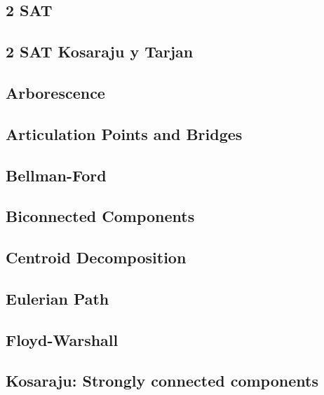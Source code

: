 \subsection{2 SAT}
\raggedbottom
\hrulefill
\subsection{2 SAT Kosaraju y Tarjan}
\raggedbottom
\hrulefill
\subsection{Arborescence}
\raggedbottom
\hrulefill
\subsection{Articulation Points and Bridges}
\raggedbottom
\hrulefill
\subsection{Bellman-Ford}
\raggedbottom
\hrulefill
\subsection{Biconnected Components}
\raggedbottom
\hrulefill
\subsection{Centroid Decomposition}
\raggedbottom
\hrulefill
\subsection{Eulerian Path}
\raggedbottom
\hrulefill
\subsection{Floyd-Warshall}
\raggedbottom
\hrulefill
\subsection{Kosaraju: Strongly connected components}
\raggedbottom
\hrulefill
